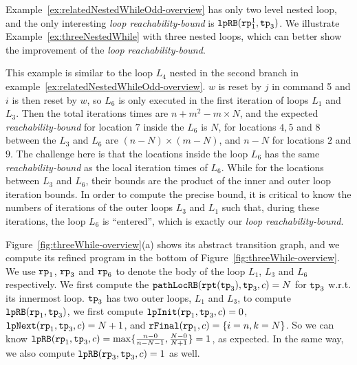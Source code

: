 Example~\ref{ex:relatedNestedWhileOdd-overview} has only two level nested loop, and
the only interesting \emph{loop reachability-bound} is $\mathtt{lpRB}(\mathtt{rp}_1^1, \mathtt{tp}_3)$.
We illustrate Example~\ref{ex:threeNestedWhile} with three nested loops, which can better show the improvement of the \emph{loop reachability-bound}.
\begin{example}
  \label{ex:threeNestedWhile}

This example is similar to the loop $L_4$ nested in the second branch in example~\ref{ex:relatedNestedWhileOdd-overview}.
$w$ is reset by $j$ in command 5 and $i$ is then reset by $w$, so $L_6$ is only executed in the first iteration of loops $L_1$ and $L_3$.
Then the total iterations times are
$n + m^2 - m \times N$,
and the expected \emph{reachability-bound} for location $7$ inside the $L_6$ is $N$,
for locations $4, 5$ and $8$ between the $L_3$ and $L_6$ are $(n-N) \times (m - N)$,
and $n - N$ for locations $2$ and $9$.
The challenge here is that the locations inside the loop $L_6$ has the same
\emph{reachability-bound} as the local iteration times of $L_6$.
While for the locations between $L_3$ and $L_6$, their bounds are the product of the inner and outer loop iteration bounds.
In order to compute the precise bound, it is critical to know
the numbers of iterations of the outer loops $L_3$ and $L_1$ such that,
during these iterations, the loop $L_6$ is ``entered'', which is exactly our \emph{loop reachability-bound}.

Figure~\ref{fig:threeWhile-overview}(a) shows its abstract transition graph,
and we compute its refined program in the bottom of Figure~\ref{fig:threeWhile-overview}. 
We use $\mathtt{rp}_1$, $\mathtt{rp}_3$ and $\mathtt{rp}_6$ to denote the body of the loop $L_1$, $L_3$ and $L_6$ respectively.
We first compute the $\mathtt{pathLocRB}(\mathtt{rpt}(\mathtt{tp}_3), \mathtt{tp}_3, c) = N $ for $\mathtt{tp}_3$ w.r.t. its innermost loop.
$\mathtt{tp}_3$ has two outer loops, $L_1$ and $L_3$,
to compute $\mathtt{lpRB}(\mathtt{rp}_1, \mathtt{tp}_3)$,
we first compute $\mathtt{lpInit}( \mathtt{rp}_1, \mathtt{tp}_3, c) = 0$,
$\mathtt{lpNext}( \mathtt{rp}_1, \mathtt{tp}_3, c) =  N + 1 $, and
$\mathtt{rFinal}(\mathtt{rp}_1, c) = \{ i = n, k = N \}$.
So we can know $\mathtt{lpRB}(\mathtt{rp}_1, \mathtt{tp}_3, c) = \max\{ \frac{n - 0}{n - N - 1}, \frac{N - 0}{N +  1}\} = 1$, as expected.
In the same way, we also compute $\mathtt{lpRB}(\mathtt{rp}_3, \mathtt{tp}_3, c) = 1$ as well.
\end{example}
